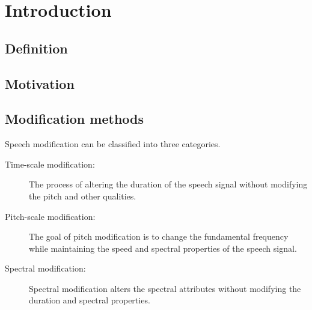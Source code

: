 \chapter{Introduction} %
\label{cha:introduction}
\section{Definition} %
\label{sec:definition}


\section{Motivation} %
\label{sec:motivation}


\section{Modification methods} %
\label{sec:synthesis_methods}
Speech modification can be classified into three categories\cite{nguyen09}.
\begin{description}
	\item[Time-scale modification: ] The process of altering the duration of the speech signal without modifying the pitch and other qualities.
	\item[Pitch-scale modification: ] The goal of pitch modification is to change the fundamental frequency while maintaining the speed and spectral properties of the speech signal.
	\item[Spectral modification: ] Spectral modification alters the spectral attributes without modifying the duration and spectral properties.
\end{description}


